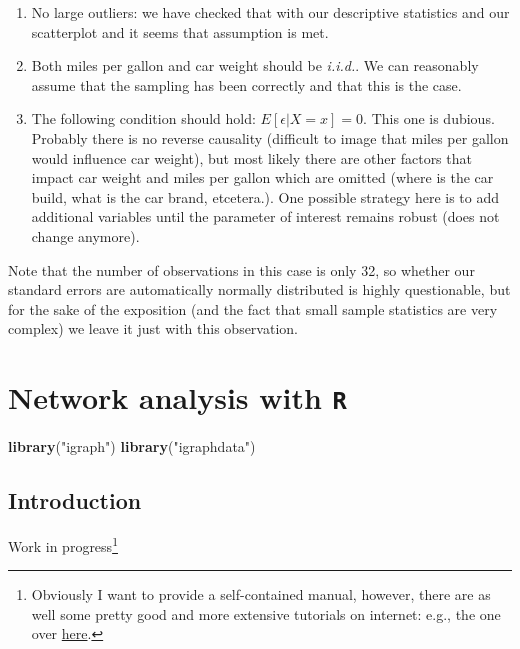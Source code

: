\documentclass[]{article}
\newenvironment{Shaded}{\begin{snugshade}}{\end{snugshade}}
\newcommand{\KeywordTok}[1]{\textcolor[rgb]{0.13,0.29,0.53}{\textbf{{#1}}}}
\newcommand{\StringTok}[1]{\textcolor[rgb]{0.31,0.60,0.02}{{#1}}}
\newcommand{\NormalTok}[1]{{#1}}
\let\rmarkdownfootnote\footnote%
\def\footnote{\protect\rmarkdownfootnote}
\begin{document}
\begin{enumerate}
\def\labelenumi{\arabic{enumi}.}
\item
  No large outliers: we have checked that with our descriptive
  statistics and our scatterplot and it seems that assumption is met.
\item
  Both miles per gallon and car weight should be \emph{i.i.d.}. We can
  reasonably assume that the sampling has been correctly and that this
  is the case.
\item
  The following condition should hold: \(E[\epsilon|X=x] = 0\). This one
  is dubious. Probably there is no reverse causality (difficult to image
  that miles per gallon would influence car weight), but most likely
  there are other factors that impact car weight and miles per gallon
  which are omitted (where is the car build, what is the car brand,
  etcetera.). One possible strategy here is to add additional variables
  until the parameter of interest remains robust (does not change
  anymore).
\end{enumerate}

Note that the number of observations in this case is only 32, so whether
our standard errors are automatically normally distributed is highly
questionable, but for the sake of the exposition (and the fact that
small sample statistics are very complex) we leave it just with this
observation.

\section{\texorpdfstring{Network analysis with
\texttt{R}}{Network analysis with R}}\label{network-analysis-with-r}

\begin{Shaded}
\begin{Highlighting}[]
\KeywordTok{library}\NormalTok{(}\StringTok{"igraph"}\NormalTok{)}
\KeywordTok{library}\NormalTok{(}\StringTok{"igraphdata"}\NormalTok{)}
\end{Highlighting}
\end{Shaded}

\subsection{Introduction}\label{introduction-1}

Work in progress\footnote{Obviously I want to provide a self-contained
  manual, however, there are as well some pretty good and more extensive
  tutorials on internet: e.g., the one over
  \href{http://kateto.net/networks-r-igraph/}{here}.}
\end{document}
